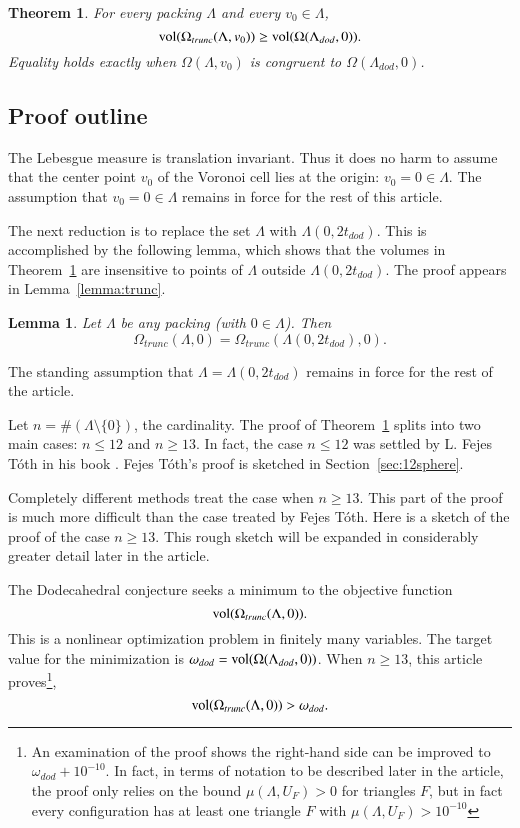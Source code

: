 \documentclass{article} %
\newtheorem{theorem}{Theorem}[section]
\newtheorem{lemma}{Lemma}[subsection]
\begin{document}
\begin{theorem}\label{thm:dodec}
  For every packing $\Lambda$ and every $v_0\in\Lambda$,
  $$
  {\operatorname{vol}}(\Omega_{trunc}(\Lambda,v_0))\ge {\operatorname{vol}}(\Omega(\Lambda_{dod},0)).
  $$
  Equality holds exactly when $\Omega(\Lambda,v_0)$ is congruent to
  $\Omega(\Lambda_{dod},0)$.
\end{theorem}

\subsection{Proof outline}

The Lebesgue measure is translation invariant. Thus it does no harm to
assume that the center point $v_0$ of the Voronoi cell lies at the
origin: $v_0 = 0 \in \Lambda$. The assumption that $v_0=0 \in\Lambda$
remains in force for the rest of this article.

The next reduction is to replace the set $\Lambda$ with
$\Lambda(0,2t_{dod})$. This is accomplished by the following lemma,
which shows that the volumes in Theorem~\ref{thm:dodec} are
insensitive to points of $\Lambda$ outside $\Lambda(0,2t_{dod})$. The
proof appears in Lemma~\ref{lemma:trunc}.

\begin{lemma} 
  Let $\Lambda$ be any packing (with $0\in \Lambda$). Then
  $$\Omega_{trunc}(\Lambda,0) = \Omega_{trunc}(\Lambda(0,2t_{dod}),0).$$
\end{lemma}

The standing assumption that $\Lambda=\Lambda(0,2t_{dod})$ remains in
force for the rest of the article.

Let $n=\#(\Lambda\setminus\{0\})$, the cardinality. The proof of
Theorem~\ref{thm:dodec} splits into two main cases: $n\le 12$ and
$n\ge 13$. In fact, the case $n\le 12$ was settled by L. Fejes T\'oth
in his book \cite{Toth:1964:Regular}. Fejes T\'oth's proof is sketched
in Section~\ref{sec:12sphere}.

Completely different methods treat the case when $n\ge 13$. This part
of the proof is much more difficult than the case treated by Fejes
T\'oth. Here is a sketch of the proof of the case $n\ge 13$. This
rough sketch will be expanded in considerably greater detail later in
the article.


The Dodecahedral conjecture seeks a minimum to the objective function
$$
{\operatorname{vol}}(\Omega_{trunc}(\Lambda,0)).
$$
This is a nonlinear optimization problem in finitely many variables.
The target value for the minimization is $\omega_{dod}={\operatorname{vol}}(\Omega(\Lambda_{dod},0))$.  When $n\ge 13$, this article proves\footnote{An examination of the proof shows the right-hand side can be improved to $\omega_{dod}+10^{-10}$.  In fact, in terms of notation to be described later in the article, the proof only
relies on the bound $\mu(\Lambda,U_F) >0$ for triangles $F$, but in fact every configuration has at least one triangle $F$ with $\mu(\Lambda,U_F) > 10^{-10}$},
$$
{\operatorname{vol}}(\Omega_{trunc}(\Lambda,0))  > \omega_{dod}.
$$
\end{document}
